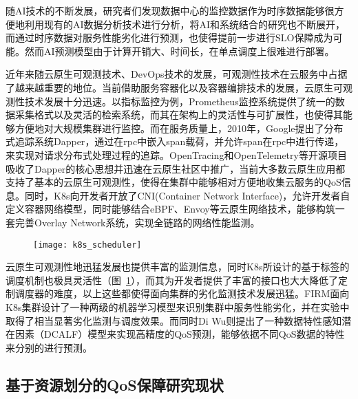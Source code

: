 随AI技术的不断发展，研究者们发现数据中心的监控数据作为时序数据能够很方便地利用现有的AI数据分析技术进行分析，将AI和系统结合的研究也不断展开，而通过时序数据对服务性能劣化进行预测\citep{qiu2020firm, zhou2022aquatope, wang2022deepscaling, gan2021sage, ghafouri2020survey,zheng2020web,wu2019posterior}，也使得提前一步进行SLO保障成为可能。然而AI预测模型由于计算开销大、时间长，在单点调度上很难进行部署。

近年来随云原生可观测技术、DevOps技术的发展，可观测性技术在云服务中占据了越来越重要的地位。当前借助服务容器化以及容器编排技术的发展，云原生可观测性技术发展十分迅速。以指标监控为例，Prometheus监控系统提供了统一的数据采集格式以及灵活的检索系统\citep{brazil2018prometheus}，而其在架构上的灵活性与可扩展性，也使得其能够方便地对大规模集群进行监控。而在服务质量上，2010年，Google提出了分布式追踪系统Dapper\citep{sigelman2010dapper}，通过在rpc中嵌入span载荷，并允许span在rpc中进行传递，来实现对请求分布式处理过程的追踪。OpenTracing和OpenTelemetry等开源项目吸收了Dapper的核心思想并迅速在云原生社区中推广，当前大多数云原生应用都支持了基本的云原生可观测性，使得在集群中能够相对方便地收集云服务的QoS信息。同时，K8s向开发者开放了CNI(Container Network Interface)\citep{k8s-network-plugins}，允许开发者自定义容器网络模型，同时能够结合eBPF、Envoy等云原生网络技术\citep{ebpf,envoyproxy}，能够构筑一套完善Overlay Network系统，实现全链路的网络性能监测。

\begin{figure}[!htbp]
    \centering
    \texttt{[image: k8s\_scheduler]}
    \label{fig:k8s_scheduler}
\end{figure}

云原生可观测性地迅猛发展也提供丰富的监测信息，同时K8s所设计的基于标签的调度机制也极具灵活性（图~\ref{fig:k8s_scheduler}），而其为开发者提供了丰富的接口也大大降低了定制调度器的难度，以上这些都使得面向集群的劣化监测技术发展迅猛\citep{xiang2023godel,zhang2022crisp}。FIRM\citep{qiu2020firm}面向K8s集群设计了一种两级的机器学习模型来识别集群中服务性能劣化，并在实验中取得了相当显著劣化监测与调度效果。而同时Di Wu\citep{wu2020data}则提出了一种数据特性感知潜在因素（DCALF）模型来实现高精度的QoS预测，能够依据不同QoS数据的特性来分别的进行预测。

\subsection{基于资源划分的QoS保障研究现状}


